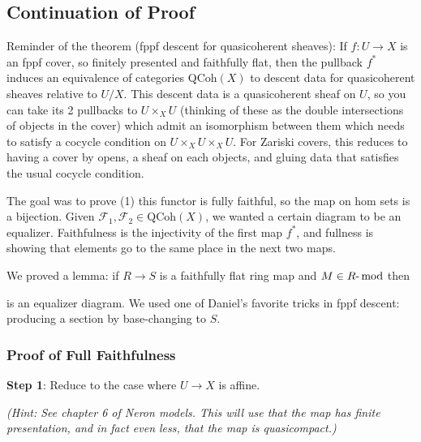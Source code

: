 \hypertarget{continuation-of-proof}{%
\subsection{Continuation of Proof}\label{continuation-of-proof}}

Reminder of the theorem (fppf descent for quasicoherent sheaves): If
\(f:U\to X\) is an fppf cover, so finitely presented and faithfully
flat, then the pullback \(f^*\) induces an equivalence of categories
\({\mathrm{QCoh}}(X)\) to descent data for quasicoherent sheaves
relative to \(U/X\). This descent data is a quasicoherent sheaf on
\(U\), so you can take its 2 pullbacks to \(U\times_X U\) (thinking of
these as the double intersections of objects in the cover) which admit
an isomorphism between them which needs to satisfy a cocycle condition
on \(U\times_X U \times_X U\). For Zariski covers, this reduces to
having a cover by opens, a sheaf on each objects, and gluing data that
satisfies the usual cocycle condition.

The goal was to prove (1) this functor is fully faithful, so the map on
hom sets is a bijection. Given
\(\mathcal{F}_1, \mathcal{F}_2 \in {\mathrm{QCoh}}(X)\), we wanted a
certain diagram to be an equalizer. Faithfulness is the injectivity of
the first map \(f^*\), and fullness is showing that elements go to the
same place in the next two maps.

We proved a lemma: if \(R\to S\) is a faithfully flat ring map and
\(M\in {R{\hbox{-}}\operatorname{mod}}\) then

is an equalizer diagram. We used one of Daniel's favorite tricks in fppf
descent: producing a section by base-changing to \(S\).

\hypertarget{proof-of-full-faithfulness}{%
\subsubsection{Proof of Full
Faithfulness}\label{proof-of-full-faithfulness}}

\begin{exercise}

\textbf{Step 1}: Reduce to the case where \(U\to X\) is affine.

\emph{(Hint: See chapter 6 of Neron models. This will use that the map
has finite presentation, and in fact even less, that the map is
quasicompact.)}

\end{exercise}

